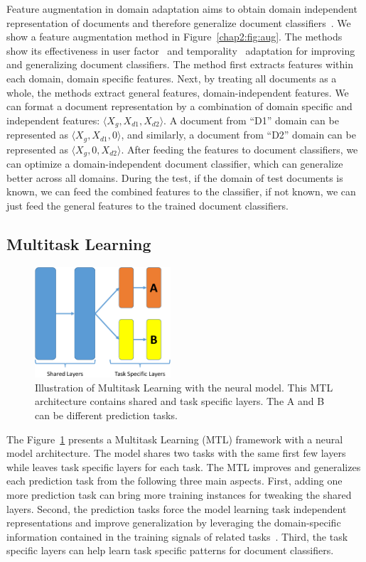 Feature augmentation in domain adaptation aims to obtain domain independent representation of documents and therefore generalize document classifiers~\cite{blitzer2006domain, daume2007frustratingly}.
We show a feature augmentation method in Figure~\ref{chap2:fig:aug}.
The methods show its effectiveness in user factor~\cite{lynn2017human} and temporality~\cite{huang2018examining} adaptation for improving and generalizing document classifiers.
The method first extracts features within each domain, domain specific features.
Next, by treating all documents as a whole, the methods extract general features, domain-independent features.
We can format a document representation by a combination of domain specific and independent features: $\langle X_g, X_{d1}, X_{d2} \rangle$.
A document from ``D1'' domain can be represented as $\langle X_g, X_{d1}, 0 \rangle$, and similarly, a document from ``D2'' domain can be represented as $\langle X_g, 0, X_{d2} \rangle$. 
After feeding the features to document classifiers, 
we can optimize a domain-independent document classifier, which can generalize better across all domains.
During the test, if the domain of test documents is known, we can feed the combined features to the classifier, if not known, we can just feed the general features to the trained document classifiers.


\subsection{Multitask Learning}

\begin{figure}[tb!]
\centering
\includegraphics[width=0.45\textwidth]{images/chapter2/multitask.pdf}
\caption{Illustration of Multitask Learning with the neural model. This MTL architecture contains shared and task specific layers. The A and B can be different prediction tasks.}
\label{chap2:fig:mtl}
\end{figure}

The Figure~\ref{chap2:fig:mtl} presents a Multitask Learning (MTL) framework with a neural model architecture.
The model shares two tasks with the same first few layers while leaves task specific layers for each task.
The MTL improves and generalizes each prediction task from the following three main aspects.
First, adding one more prediction task can bring more training instances for tweaking the shared layers. 
Second, the prediction tasks force the model learning task independent representations and improve generalization by leveraging the domain-specific information contained in the training signals of related tasks~\cite{Caruana1997multitask}.
Third, the task specific layers can help learn task specific patterns for document classifiers.

